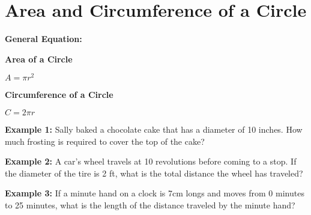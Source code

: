 \section[Circles]{Area and Circumference of a Circle}

\textbf{General Equation:}

\begin{center}
\setlength{\columnseprule}{0pt}
\begin{multicols}{2}
\textbf{Area of a Circle}

\medskip
$A=\pi r^2$

\textbf{Circumference of a Circle}

\medskip
$C=2\pi r$
\end{multicols}
\end{center}

\vfill\textbf{Example 1:} Sally baked a chocolate cake that has a diameter of 10 inches. How much frosting is required to cover the top of the cake?

\vfill\textbf{Example 2:} A car's wheel travels at 10 revolutions before coming to a stop. If the diameter of the tire is 2 ft, what is the total distance the wheel has traveled?

\vfill\textbf{Example 3:} If a minute hand on a clock is 7cm longs and moves from 0 minutes to 25 minutes, what is the length of the distance traveled by the minute hand?

